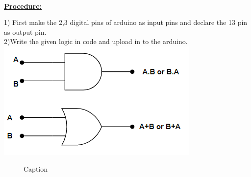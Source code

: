 \documentclass[letterpaper, 10 pt, conference]{ieeeconf}
\begin{document}
\vspace{5mm}
\\ \raggedright \textbf{\underline{Procedure:}}\vspace{2mm}
\\ \raggedright 1) First make the 2,3 digital pins of arduino as input pins and declare the 13 pin as output pin.
\\ 2)Write the given logic in code and upload in to the arduino.
    \includegraphics{pic.png}

\begin{figure}

    \centering
    

    \caption{Caption}
    \label{fig:my_label}
\end{figure}
\vspace{5mm}
\end{document}

